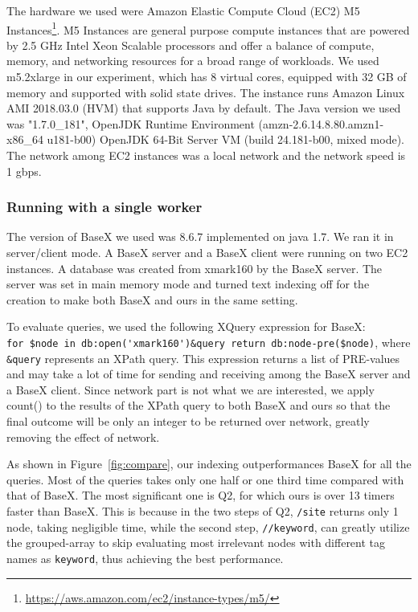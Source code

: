The hardware we used were Amazon Elastic Compute Cloud (EC2) M5
Instances\footnote{\url{https://aws.amazon.com/ec2/instance-types/m5/}}. M5
Instances are general purpose compute instances that are powered by 2.5 GHz
Intel Xeon Scalable processors and offer a balance of compute, memory, and
networking resources for a broad range of workloads.  We used m5.2xlarge in our
experiment, which has 8 virtual cores, equipped with 32 GB of memory and
supported with solid state drives.  The instance runs Amazon Linux AMI 2018.03.0
(HVM) that supports Java by default. The Java version we used was "1.7.0\_181",
OpenJDK Runtime Environment (amzn-2.6.14.8.80.amzn1-x86\_64 u181-b00) OpenJDK
64-Bit Server VM (build 24.181-b00, mixed mode). The network among EC2 instances
was a local network and the network speed is 1 gbps.


\subsubsection{Running with a single worker}

The version of BaseX we used was 8.6.7 implemented on java 1.7. We ran it in
server/client mode. A BaseX server and a BaseX client were running on two EC2
instances. A database was created from xmark160 by the BaseX server. The server
was set in main memory mode and turned text indexing off for the creation to
make both BaseX and ours in the same setting.

To evaluate queries, we used the following XQuery expression for BaseX:  \\
\verb|for $node in db:open('xmark160')&query return db:node-pre($node)|, where \\ \verb|&query|
represents an XPath query. This expression returns a list of PRE-values and may
take a lot of time for sending and receiving among the BaseX server and a BaseX
client. Since network part is not what we are interested, we apply count() to
the results of the XPath query to both BaseX and ours so that the final outcome
will be only an integer to be returned over network, greatly removing the effect
of network.

As shown in Figure~\ref{fig:compare}, our indexing outperformances BaseX for all
the queries. Most of the queries takes only one half or one third time compared
with that of BaseX. The most significant one is Q2, for which ours is over 13
timers faster than BaseX. This is because in the two steps of Q2, \texttt{/site}
returns only 1 node, taking negligible time, while the second step,
\texttt{//keyword}, can greatly utilize the grouped-array to skip evaluating
most irrelevant nodes with different tag names as \texttt{keyword}, thus
achieving the best performance.


